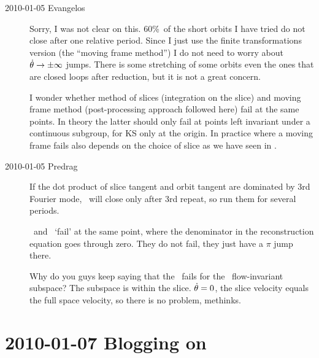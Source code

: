 \begin{description}
\item[2010-01-05 Evangelos] Sorry, I was not clear on this. 60\%\ of the short orbits
I have tried do not close after one relative period. Since I just use the finite
transformations version (the ``moving frame method'') I do not need to worry about
$ \dot{\gSpace} \to \pm\infty$ jumps. There is some stretching of some orbits even the
ones that are closed loops after reduction, but it is not a great concern.

I wonder whether method of slices (integration on the slice) and moving
frame method (post-processing approach followed here) fail at the same
points. In theory the latter should only fail at points left invariant
under a continuous subgroup, for KS only at the origin. In practice where
a moving frame fails also depends on the choice of slice as we have seen
in \cLe.

\item[2010-01-05 Predrag] If the dot product of slice tangent
and orbit tangent are dominated by 3rd Fourier mode, \rpo\
will close only after 3rd repeat, so run them for several
periods.

\Mslices\ and \mframes\ `fail' at the same point, where the
denominator in the reconstruction equation goes through zero.
They do not fail, they just have a $\pi$ jump there.

Why do you guys keep saying that the \mslices\ fails for the
\Fix{\Group}\ flow-invariant subspace? The subspace is within
the slice. $\dot{\gSpace}=0$, the slice velocity equals the
full space velocity, so there is no problem, methinks.

\end{description}

\renewcommand{\LieElrep}{\ensuremath{\mathbf{G}}} %
\renewcommand{\LieEl}{\ensuremath{\gamma}}  %
\renewcommand{\gSpace}{\ensuremath{{\bf \theta}}}   %

\section{2010-01-07 Blogging on}

